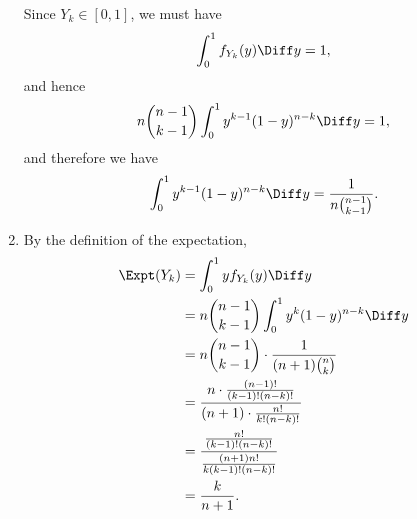 \begin{enumerate}
          Since \(Y_k \in [0, 1]\), we must have
          \[
              \int_{0}^{1} f_{Y_k} (y) \Diff y = 1,
          \]
          and hence
          \[
              n \binom{n - 1}{k - 1} \int_{0}^{1} y^{k - 1} (1 - y)^{n - k} \Diff y = 1,
          \]
          and therefore we have
          \[
              \int_{0}^{1} y^{k - 1} (1 - y)^{n - k} \Diff y = \frac{1}{n \binom{n - 1}{k - 1}}.
          \]

    \item By the definition of the expectation,
          \begin{align*}
              \Expt(Y_k) & = \int_{0}^{1} y f_{Y_k}(y) \Diff y                                                       \\
                         & = n \binom{n - 1}{k - 1} \int_{0}^{1} y^{k} (1 - y)^{n - k} \Diff y                       \\
                         & = n \binom{n - 1}{k - 1} \cdot \frac{1}{(n + 1) \binom{n}{k}}                             \\
                         & = \frac{n \cdot \frac{(n - 1)!}{(k - 1)! (n - k)!}}{(n + 1) \cdot \frac{n!}{k! (n - k)!}} \\
                         & = \frac{\frac{n!}{(k - 1)! (n - k)!}}{\frac{(n + 1) n!}{k (k - 1)! (n - k)!}}             \\
                         & =\frac{k}{n + 1}.
          \end{align*}
\end{enumerate}